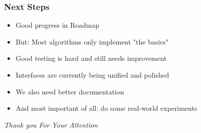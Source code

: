 \documentclass[xcolor=x11names,compress]{beamer}
\begin{document}
\begin{frame}
    \frametitle{Next Steps}

    \begin{itemize}
        \item<2-> Good progress in Roadmap
        \item<3-> But: Most algorithms only implement "the basics"
	\item<4-> Good testing is hard and still needs improvement
        \item<4-> Interfaces are currently being unified and polished
        \item<5-> We also need better documentation
        \item<6-> And most important of all: do some real-world experiments
    \end{itemize}

\end{frame}

\begin{frame}
	\centering \Large

	\emph{Thank you For Your Attention} 

    \vspace{5em}

\end{frame}
\end{document}
